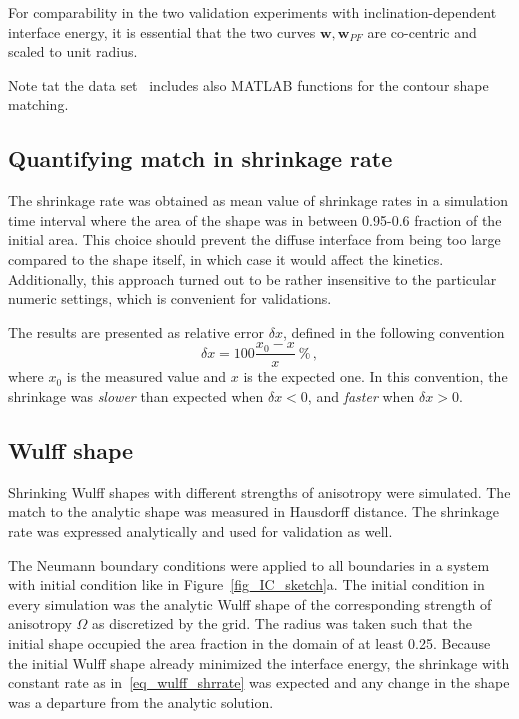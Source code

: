 For comparability in the two validation experiments with inclination-dependent interface energy, it is essential that the two curves $\bm{w},\bm{w}_{PF}$ are co-centric and scaled to unit radius.

Note tat the data set~\cite{Minar2022dataset} includes also MATLAB functions for the contour shape matching.

\subsection{Quantifying match in shrinkage rate}
The shrinkage rate was obtained as mean value of shrinkage rates in a simulation time interval where the area of the shape was in between 0.95-0.6 fraction of the initial area. This choice should prevent the diffuse interface from being too large compared to the shape itself, in which case it would affect the kinetics. Additionally, this approach turned out to be rather insensitive to the particular numeric settings, which is convenient for validations. 

The results are presented as relative error $\delta x$, defined in the following convention
\begin{equation}
	\delta x = 100 \frac{x_0-x}{x}~\%\,,
\end{equation}
where $x_0$ is the measured value and $x$ is the expected one. In this convention, the shrinkage was \textit{slower} than expected when $\delta x<0$, and \textit{faster} when $\delta x > 0$.

\subsection{Wulff shape}

Shrinking Wulff shapes with different strengths of anisotropy were simulated. The match to the analytic shape was measured in Hausdorff distance. The shrinkage rate was expressed analytically and used for validation as well.

The Neumann boundary conditions were applied to all boundaries in a system with initial condition like in Figure~\ref{fig_IC_sketch}a. The initial condition in every simulation was the analytic Wulff shape of the corresponding strength of anisotropy $\Omega$ as discretized by the grid. The radius was taken such that the initial shape occupied the area fraction in the domain of at least 0.25. Because the initial Wulff shape already minimized the interface energy, the shrinkage with constant rate as in~\eqref{eq_wulff_shrrate} was expected and any change in the shape was a departure from the analytic solution. 


